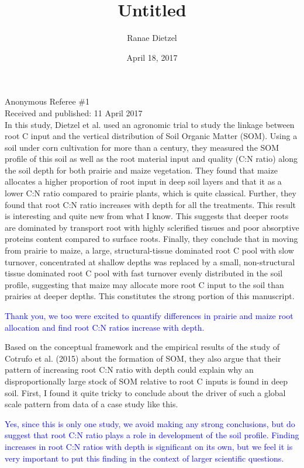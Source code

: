 \documentclass[]{article}
\title{Untitled}
\author{Ranae Dietzel}
\date{April 18, 2017}
\begin{document}
\maketitle

Anonymous Referee \#1\\
Received and published: 11 April 2017\\
In this study, Dietzel et al. used an agronomic trial to study the
linkage between root C input and the vertical distribution of Soil
Organic Matter (SOM). Using a soil under corn cultivation for more than
a century, they measured the SOM profile of this soil as well as the
root material input and quality (C:N ratio) along the soil depth for
both prairie and maize vegetation. They found that maize allocates a
higher proportion of root input in deep soil layers and that it as a
lower C:N ratio compared to prairie plants, which is quite classical.
Further, they found that root C:N ratio increases with depth for all the
treatments. This result is interesting and quite new from what I know.
This suggests that deeper roots are dominated by transport root with
highly sclerified tissues and poor absorptive proteins content compared
to surface roots. Finally, they conclude that in moving from prairie to
maize, a large, structural-tissue dominated root C pool with slow
turnover, concentrated at shallow depths was replaced by a small,
non-structural tissue dominated root C pool with fast turnover evenly
distributed in the soil profile, suggesting that maize may allocate more
root C input to the soil than prairies at deeper depths. This
constitutes the strong portion of this manuscript.

\textcolor{blue}{Thank you, we too were excited to quantify differences in prairie and maize root allocation and find root C:N ratios increase with depth.}

Based on the conceptual framework and the empirical results of the study
of Cotrufo et al. (2015) about the formation of SOM, they also argue
that their pattern of increasing root C:N ratio with depth could explain
why an disproportionally large stock of SOM relative to root C inputs is
found in deep soil. First, I found it quite tricky to conclude about the
driver of such a global scale pattern from data of a case study like
this.

\textcolor{blue}{Yes, since this is only one study, we avoid making any strong conclusions, but do suggest that root C:N ratio plays a role in development of the soil profile. Finding increases in root C:N ratios with depth is significant on its own, but we feel it is very important to put this finding in the context of larger scientific questions.}
\end{document}
